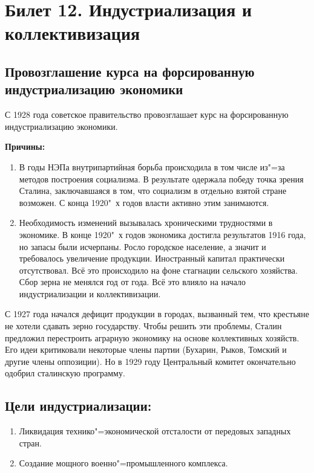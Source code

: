 \section{Билет 12. Индустриализация и коллективизация}

\subsection{Провозглашение курса на форсированную индустриализацию экономики}

С 1928 года советское правительство провозглашает курс на форсированную индустриализацию экономики. 

\textbf{Причины:}

\begin{enumerate}
    \item В годы НЭПа внутрипартийная борьба происходила в том числе из"=за методов построения социализма. В результате одержала победу точка зрения Сталина, заключавшаяся в том, что социализм в отдельно взятой стране возможен. С конца 1920"~х годов власти активно этим занимаются.
    \item Необходимость изменений вызывалась хроническими трудностями в экономике. В конце 1920"~х годов экономика достигла результатов 1916 года, но запасы были исчерпаны. Росло городское население, а значит и требовалось увеличение продукции. Иностранный капитал практически отсутствовал. Всё это происходило на фоне стагнации сельского хозяйства. Сбор зерна не менялся год от года. Всё это влияло на начало индустриализации и коллективизации.
\end{enumerate}

С 1927 года начался дефицит продукции в городах, вызванный тем, что крестьяне не хотели сдавать зерно государству. Чтобы решить эти проблемы, Сталин предложил перестроить аграрную экономику на основе коллективных хозяйств. Его идеи критиковали некоторые члены партии (Бухарин, Рыков, Томский и другие члены оппозиции). Но в 1929 году Центральный комитет окончательно одобрил сталинскую программу.

\subsection{Цели индустриализации:}

\begin{enumerate}
    \item Ликвидация технико"=экономической отсталости от передовых западных стран.
    \item Создание мощного военно"=промышленного комплекса.
\end{enumerate}


